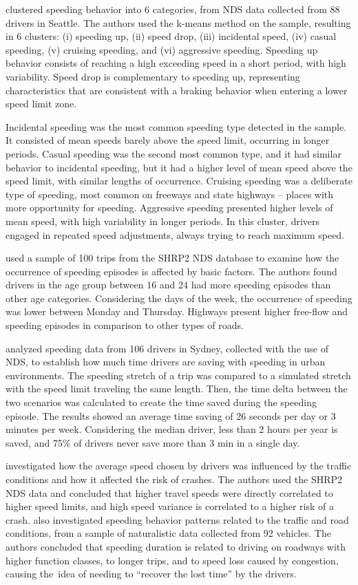 \textcite{Richard2017} clustered speeding behavior into 6 categories, from NDS data collected from 88 drivers in Seattle. The authors used the k-means method on the sample, resulting in 6 clusters: (i) speeding up, (ii) speed drop, (iii) incidental speed, (iv) casual speeding, (v) cruising speeding, and (vi) aggressive speeding. Speeding up behavior consists of reaching a high exceeding speed in a short period, with high variability. Speed drop is complementary to speeding up, representing characteristics that are consistent with a braking behavior when entering a lower speed limit zone. 

Incidental speeding was the most common speeding type detected in the sample. It consisted of mean speeds barely above the speed limit, occurring in longer periods. Casual speeding was the second most common type, and it had similar behavior to incidental speeding, but it had a higher level of mean speed above the speed limit, with similar lengths of occurrence. Cruising speeding was a deliberate type of speeding, most common on freeways and state highways – places with more opportunity for speeding. Aggressive speeding presented higher levels of mean speed, with high variability in longer periods. In this cluster, drivers engaged in repeated speed adjustments, always trying to reach maximum speed.

\textcite{Richard2020} used a sample of 100 trips from the SHRP2 NDS database to examine how the occurrence of speeding episodes is affected by basic factors. The authors found drivers in the age group between 16 and 24 had more speeding episodes than other age categories. Considering the days of the week, the occurrence of speeding was lower between Monday and Thursday. Highways present higher free-flow and speeding episodes in comparison to other types of roads. 

\textcite{Ellison2015} analyzed speeding data from 106 drivers in Sydney, collected with the use of NDS, to establish how much time drivers are saving with speeding in urban environments. The speeding stretch of a trip was compared to a simulated stretch with the speed limit traveling the same length. Then, the time delta between the two scenarios was calculated to create the time saved during the speeding episode. The results showed an average time saving of 26 seconds per day or 3 minutes per week. Considering the median driver, less than 2 hours per year is saved, and 75\% of drivers never save more than 3 min in a single day. 

\textcite{Hamzeie2017} investigated how the average speed chosen by drivers was influenced by the traffic conditions and how it affected the risk of crashes. The authors used the SHRP2 NDS data and concluded that higher travel speeds were directly correlated to higher speed limits, and high speed variance is correlated to a higher risk of a crash. \textcite{Kong2020} also investigated speeding behavior patterns related to the traffic and road conditions, from a sample of naturalistic data collected from 92 vehicles. The authors concluded that speeding duration is related to driving on roadways with higher function classes, to longer trips, and to speed loss caused by congestion, causing the\ idea of needing to ``recover the lost time'' by the drivers.

